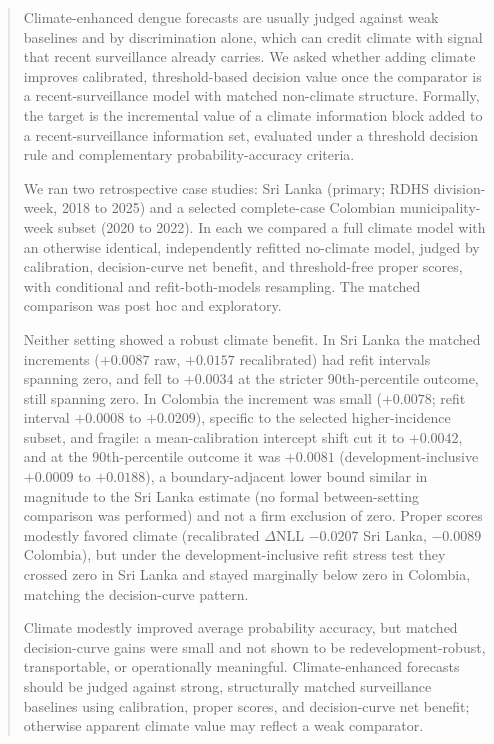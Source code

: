\documentclass[11pt,a4paper]{article}
\begin{document}
\begin{abstract}
\noindent Climate-enhanced dengue forecasts are usually judged against weak baselines and by discrimination alone, which can credit climate with signal that recent surveillance already carries. We asked whether adding climate improves calibrated, threshold-based decision value once the comparator is a recent-surveillance model with matched non-climate structure. Formally, the target is the incremental value of a climate information block added to a recent-surveillance information set, evaluated under a threshold decision rule and complementary probability-accuracy criteria.

\noindent We ran two retrospective case studies: Sri Lanka (primary; RDHS division-week, 2018 to 2025) and a selected complete-case Colombian municipality-week subset (2020 to 2022). In each we compared a full climate model with an otherwise identical, independently refitted no-climate model, judged by calibration, decision-curve net benefit, and threshold-free proper scores, with conditional and refit-both-models resampling. The matched comparison was post hoc and exploratory.

\noindent Neither setting showed a robust climate benefit. In Sri Lanka the matched increments ($+0.0087$ raw, $+0.0157$ recalibrated) had refit intervals spanning zero, and fell to $+0.0034$ at the stricter 90th-percentile outcome, still spanning zero. In Colombia the increment was small ($+0.0078$; refit interval $+0.0008$ to $+0.0209$), specific to the selected higher-incidence subset, and fragile: a mean-calibration intercept shift cut it to $+0.0042$, and at the 90th-percentile outcome it was $+0.0081$ (development-inclusive $+0.0009$ to $+0.0188$), a boundary-adjacent lower bound similar in magnitude to the Sri Lanka estimate (no formal between-setting comparison was performed) and not a firm exclusion of zero. Proper scores modestly favored climate (recalibrated $\Delta$NLL $-0.0207$ Sri Lanka, $-0.0089$ Colombia), but under the development-inclusive refit stress test they crossed zero in Sri Lanka and stayed marginally below zero in Colombia, matching the decision-curve pattern.

\noindent Climate modestly improved average probability accuracy, but matched decision-curve gains were small and not shown to be redevelopment-robust, transportable, or operationally meaningful. Climate-enhanced forecasts should be judged against strong, structurally matched surveillance baselines using calibration, proper scores, and decision-curve net benefit; otherwise apparent climate value may reflect a weak comparator.
\end{abstract}
\end{document}

